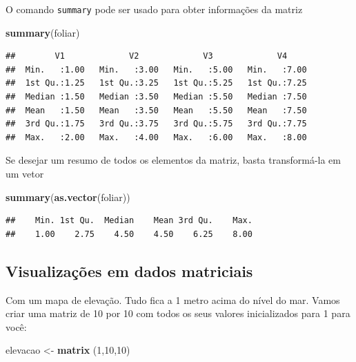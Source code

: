 \documentclass[]{book}
\newenvironment{Shaded}{\begin{snugshade}}{\end{snugshade}}
\newcommand{\DecValTok}[1]{\textcolor[rgb]{0.00,0.00,0.81}{#1}}
\newcommand{\KeywordTok}[1]{\textcolor[rgb]{0.13,0.29,0.53}{\textbf{#1}}}
\newcommand{\NormalTok}[1]{#1}
\newcommand{\StringTok}[1]{\textcolor[rgb]{0.31,0.60,0.02}{#1}}
\begin{document}
O comando \texttt{summary} pode ser usado para obter informações da matriz

\begin{Shaded}
\begin{Highlighting}[]
\KeywordTok{summary}\NormalTok{(foliar)}
\end{Highlighting}
\end{Shaded}

\begin{verbatim}
##        V1             V2             V3             V4      
##  Min.   :1.00   Min.   :3.00   Min.   :5.00   Min.   :7.00  
##  1st Qu.:1.25   1st Qu.:3.25   1st Qu.:5.25   1st Qu.:7.25  
##  Median :1.50   Median :3.50   Median :5.50   Median :7.50  
##  Mean   :1.50   Mean   :3.50   Mean   :5.50   Mean   :7.50  
##  3rd Qu.:1.75   3rd Qu.:3.75   3rd Qu.:5.75   3rd Qu.:7.75  
##  Max.   :2.00   Max.   :4.00   Max.   :6.00   Max.   :8.00
\end{verbatim}

Se desejar um resumo de todos os elementos da matriz, basta transformá-la em um vetor

\begin{Shaded}
\begin{Highlighting}[]
\KeywordTok{summary}\NormalTok{(}\KeywordTok{as.vector}\NormalTok{(foliar))}
\end{Highlighting}
\end{Shaded}

\begin{verbatim}
##    Min. 1st Qu.  Median    Mean 3rd Qu.    Max. 
##    1.00    2.75    4.50    4.50    6.25    8.00
\end{verbatim}

\hypertarget{visualizacoes-em-dados-matriciais}{%
\subsection{Visualizações em dados matriciais}\label{visualizacoes-em-dados-matriciais}}

Com um mapa de elevação. Tudo fica a 1 metro acima do nível do mar. Vamos criar uma matriz de 10 por 10 com todos os seus valores inicializados para 1 para você:

\begin{Shaded}
\begin{Highlighting}[]
\NormalTok{elevacao <-}\StringTok{ }\KeywordTok{matrix}\NormalTok{ (}\DecValTok{1}\NormalTok{,}\DecValTok{10}\NormalTok{,}\DecValTok{10}\NormalTok{)}
\end{Highlighting}
\end{Shaded}
\end{document}
